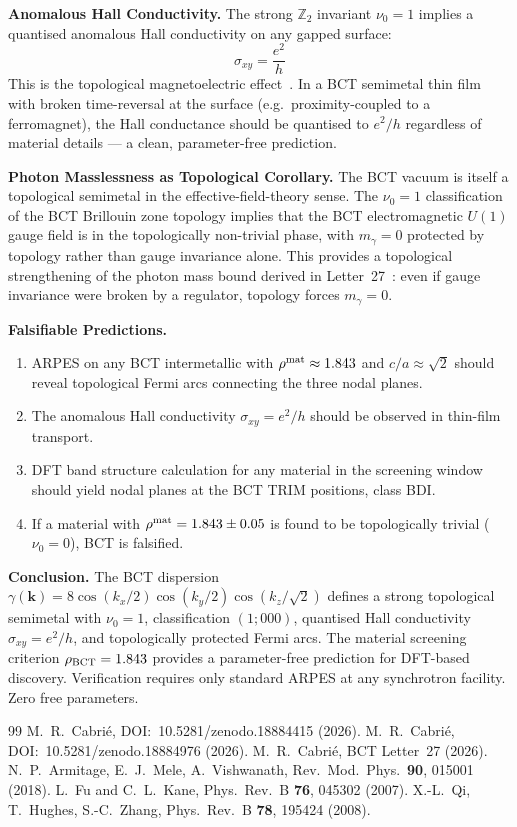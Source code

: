 \documentclass[aps,prl,twocolumn,superscriptaddress,floatfix]{revtex4-2}
\begin{document}
\medskip
\noindent\textbf{Anomalous Hall Conductivity.}
The strong $\mathbb{Z}_2$ invariant $\nu_0 = 1$ implies a quantised
anomalous Hall conductivity on any gapped surface:
\begin{equation}
  \sigma_{xy} = \frac{e^2}{h}
  \label{eq:AHE}
\end{equation}
This is the topological magnetoelectric effect~\cite{Qi2008}.
In a BCT semimetal thin film with broken time-reversal at the surface
(e.g.\ proximity-coupled to a ferromagnet), the Hall conductance
should be quantised to $e^2/h$ regardless of material details —
a clean, parameter-free prediction.

\medskip
\noindent\textbf{Photon Masslessness as Topological Corollary.}
The BCT vacuum is itself a topological semimetal in the effective-field-theory
sense. The $\nu_0 = 1$ classification of the BCT Brillouin zone topology
implies that the BCT electromagnetic $U(1)$ gauge field is in the topologically
non-trivial phase, with $m_\gamma = 0$ protected by topology rather than
gauge invariance alone. This provides a topological strengthening of the
photon mass bound derived in Letter~27~\cite{L27}: even if gauge invariance
were broken by a regulator, topology forces $m_\gamma = 0$.

\medskip
\noindent\textbf{Falsifiable Predictions.}
\begin{enumerate}
\item ARPES on any BCT intermetallic with $\rho^{\rm mat} \approx 1.843$
  and $c/a \approx \sqrt{2}$ should reveal topological Fermi arcs connecting
  the three nodal planes.
\item The anomalous Hall conductivity $\sigma_{xy} = e^2/h$ should be
  observed in thin-film transport.
\item DFT band structure calculation for any material in the screening window
  should yield nodal planes at the BCT TRIM positions, class BDI.
\item If a material with $\rho^{\rm mat} = 1.843 \pm 0.05$ is found to be
  topologically trivial ($\nu_0 = 0$), BCT is falsified.
\end{enumerate}

\medskip
\noindent\textbf{Conclusion.}
The BCT dispersion $\gamma(\mathbf{k}) = 8\cos(k_x/2)\cos(k_y/2)\cos(k_z/\sqrt{2})$
defines a strong topological semimetal with $\nu_0 = 1$, classification $(1;000)$,
quantised Hall conductivity $\sigma_{xy} = e^2/h$, and topologically protected
Fermi arcs. The material screening criterion $\rho_{\rm BCT} = 1.843$ provides
a parameter-free prediction for DFT-based discovery. Verification requires
only standard ARPES at any synchrotron facility. Zero free parameters.

\begin{thebibliography}{99}
 M.~R.~Cabri\'e,
  DOI:~10.5281/zenodo.18884415 (2026).
 M.~R.~Cabri\'e,
  DOI:~10.5281/zenodo.18884976 (2026).
 M.~R.~Cabri\'e, BCT Letter~27 (2026).
 N.~P.~Armitage, E.~J.~Mele, A.~Vishwanath,
  Rev.\ Mod.\ Phys.\ \textbf{90}, 015001 (2018).
 L.~Fu and C.~L.~Kane,
  Phys.\ Rev.\ B \textbf{76}, 045302 (2007).
 X.-L.~Qi, T.~Hughes, S.-C.~Zhang,
  Phys.\ Rev.\ B \textbf{78}, 195424 (2008).
\end{thebibliography}
\end{document}
